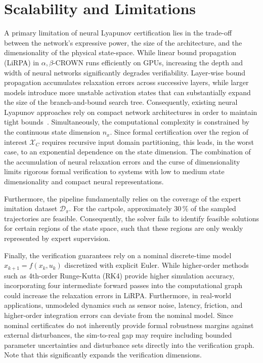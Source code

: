 \section{Scalability and Limitations}
\label{sec:discussion-limitations}

A primary limitation of neural Lyapunov certification lies in the trade-off between the network's expressive power,
the size of the architecture, and the dimensionality of the physical state-space.
While linear bound propagation (LiRPA) in $\alpha,\beta$-CROWN runs efficiently on GPUs, 
increasing the depth and width of neural networks significantly degrades verifiability. 
Layer-wise bound propagation accumulates relaxation errors across successive layers, 
while larger models introduce more unstable activation states that can substantially expand 
the size of the branch-and-bound search tree. 
Consequently, existing neural Lyapunov approaches rely on compact network architectures 
in order to maintain tight bounds~.
Simultaneously, the computational complexity is constrained by the continuous state dimension $n_x$. 
Since formal certification over the region of interest $\mathcal{X}_C$ requires recursive input domain partitioning, 
this leads, in the worst case, to an exponential dependence on the state dimension.
The combination of the accumulation of neural relaxation errors and the curse of dimensionality 
limits rigorous formal verification to systems with low to medium state dimensionality
and compact neural representations. 

Furthermore, the pipeline fundamentally relies on the coverage of the expert imitation dataset $\mathcal{D}_\pi$. 
For the cartpole, approximately 30\,\% of the sampled trajectories are feasible. 
Consequently, the solver fails to identify feasible solutions for certain regions of the state space, 
such that these regions are only weakly represented by expert supervision.

Finally, the verification guarantees rely on a nominal discrete-time model $x_{k+1} = f(x_k, u_k)$ discretized with 
explicit Euler. While higher-order methods such as 4th-order Runge-Kutta (RK4) provide higher simulation accuracy, 
incorporating four intermediate forward passes into the computational graph could increase the relaxation errors in LiRPA.
Furthermore, in real-world applications, unmodeled dynamics such as sensor noise, latency, friction, 
and higher-order integration errors can deviate from the nominal model. 
Since nominal certificates do not inherently provide formal robustness margins against external disturbances, 
the sim-to-real gap may require including bounded parameter uncertainties and disturbance sets directly 
into the verification graph. Note that this significantly expands the verification dimensions.